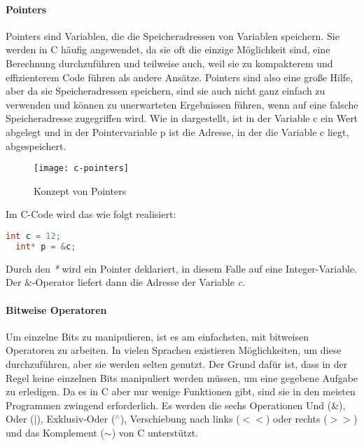  \paragraph{Pointers}
  Pointers sind Variablen, die die Speicheradressen von Variablen speichern. Sie werden in C häufig
  angewendet, da sie oft die einzige Möglichkeit sind, eine Berechnung durchzuführen und teilweise
  auch, weil sie zu kompakterem und effizienterem Code führen als andere Ansätze. \cite{kernighan88}
  Pointers sind also eine große Hilfe, aber da sie Speicheradressen speichern, sind sie auch nicht ganz
  einfach zu verwenden und können zu unerwarteten Ergebnissen führen, wenn auf eine falsche
  Speicheradresse zugegriffen wird. Wie in  dargestellt, ist in der Variable c ein
  Wert abgelegt und in der Pointervariable p ist die Adresse, in der die Variable c liegt, abgespeichert.
  
  \begin{figure}[h!]
   \begin{center}
    \texttt{[image: c-pointers]}
   \end{center}
   \caption[Konzept von Pointers in C]{Konzept von Pointers \cite{kernighan88}}
   \label{fig:c-pointers}
  \end{figure}
  
  Im C-Code wird das wie folgt realisiert:

  \begin{lstlisting}[language=C]
  int c = 12;
  int* p = &c;
  \end{lstlisting}
  Durch den \emph{*} wird ein Pointer deklariert, in diesem Falle auf eine Integer-Variable. Der \&-Operator
  liefert dann die Adresse der Variable \emph{c}.

  \paragraph{Bitweise Operatoren}
  Um einzelne Bits zu manipulieren, ist es am einfachsten, mit bitweisen Operatoren zu arbeiten. In vielen
  Sprachen existieren Möglichkeiten, um diese durchzuführen, aber sie werden selten genutzt. Der Grund
  dafür ist, dass in der Regel keine einzelnen Bits manipuliert werden müssen, um eine gegebene Aufgabe
  zu erledigen. Da es in C aber nur wenige Funktionen gibt, sind sie in den meisten Programmen zwingend
  erforderlich. Es werden die sechs Operationen Und (\&), Oder ($|$), Exklusiv-Oder ($^{\wedge}$), Verschiebung nach
  links ($<<$) oder rechts ($>>$) und das Komplement ($\sim$) von C unterstützt.

